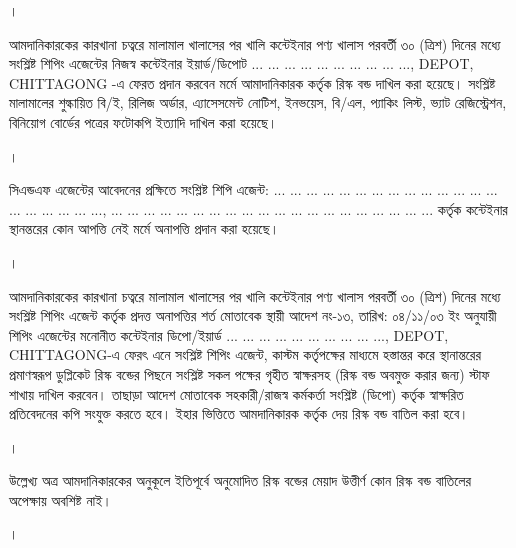 \documentclass[12pt]{article}
\newcommand{\rdepo}{... ... ... ... ... ... ... ... ... ..., DEPOT, CHITTAGONG}
\newcommand{\san}{... ... ... ... ... ... ... ... ... ... ... ... ... ... ... ... ... ... ... ...}
\newcommand{\sad}{... ... ... ... ... ... ... ... ... ... ... ... ... ... ... ... ... ... ... ...}
\begin{document}
\begin{minipage}[t]{0.04\linewidth}
।
\end{minipage}
\begin{minipage}[t]{0.96\linewidth}
আমদানিকারকের কারখানা চত্বরে মালামাল
খালাসের পর খালি কন্টেইনার পণ্য খালাস
পরবর্তী ৩০ (ত্রিশ) দিনের মধ্যে
সংশ্লিষ্ট শিপিং এজেন্টের নিজস্ব কন্টেইনার
ইয়ার্ড/ডিপোট {\rdepo} -এ ফেরত প্রদান করবেন
মর্মে আমাদানিকারক কর্তৃক রিস্ক বন্ড দাখিল
করা হয়েছে।
সংশ্লিষ্ট মালামালের শুল্কায়িত বি/ই,
রিলিজ অর্ডার, এ্যাসেসমেন্ট নোটিশ,
ইনভয়েস, বি/এল, প্যাকিং লিস্ট,
ভ্যাট রেজিস্ট্রেশন, বিনিয়োগ বোর্ডের
পত্রের ফটোকপি ইত্যাদি দাখিল করা হয়েছে।
\\
\end{minipage}
\begin{minipage}[t]{0.04\linewidth}
।
\end{minipage}
\begin{minipage}[t]{0.96\linewidth}
সিএন্ডএফ এজেন্টের আবেদনের প্রক্ষিতে
সংশ্লিষ্ট শিপি এজেন্ট:
{\san}, {\sad}
কর্তৃক কন্টেইনার স্থানন্তরের কোন আপত্তি নেই
মর্মে অনাপত্তি প্রদান করা হয়েছে।
\\
\end{minipage}
\begin{minipage}[t]{0.04\linewidth}
।
\end{minipage}
\begin{minipage}[t]{0.96\linewidth}
আমদানিকারকের কারখানা চত্বরে মালামাল
খালাসের পর খালি কন্টেইনার পণ্য খালাস পরবর্তী
৩০ (ত্রিশ) দিনের মধ্যে
সংশ্লিষ্ট শিপিং এজেন্ট কর্তৃক প্রদত্ত
অনাপত্তির শর্ত মোতাবেক
স্থায়ী আদেশ নং-১৩,
তারিখ: ০৪/১১/০৩ ইং
অনুযায়ী শিপিং এজেন্টের মনোনীত
কন্টেইনার ডিপো/ইয়ার্ড {\rdepo}-এ
ফেরৎ এনে সংশ্লিষ্ট শিপিং এজেন্ট,
কাস্টম কর্তৃপক্ষের মাধ্যমে হস্তান্তর করে
স্থানান্তরের প্রমাণস্বরূপ ডুপ্লিকেট রিস্ক বন্ডের পিছনে
সংশ্লিষ্ট সকল পক্ষের গৃহীত স্বাক্ষরসহ
(রিস্ক বন্ড অবমুক্ত করার জন্য)
স্টাফ শাখায় দাখিল করবেন।
তাছাড়া আদেশ মোতাবেক
সহকারী/রাজস্ব কর্মকর্তা সংশ্লিষ্ট (ডিপো) কর্তৃক
স্বাক্ষরিত প্রতিবেদনের কপি সংযুক্ত করতে হবে।
ইহার ভিত্তিতে আমদানিকারক কর্তৃক দেয়
রিস্ক বন্ড বাতিল করা হবে।
\\
\end{minipage}
\begin{minipage}[t]{0.04\linewidth}
।
\end{minipage}
\begin{minipage}[t]{0.96\linewidth}
উল্লেখ্য অত্র আমদানিকারকের অনুকূলে ইতিপূর্বে
অনুমোদিত রিস্ক বন্ডের মেয়াদ উত্তীর্ণ কোন
রিস্ক বন্ড বাতিলের অপেক্ষায় অবশিষ্ট নাই।
\\
\end{minipage}
\begin{minipage}[t]{0.04\linewidth}
।
\end{minipage}
\end{document}
